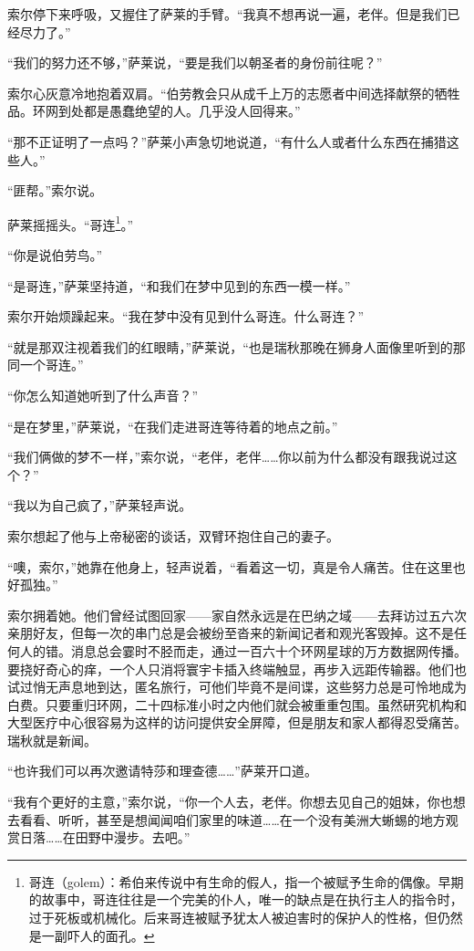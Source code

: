 \documentclass[AutoFakeBold=true]{book}
\begin{document}
索尔停下来呼吸，又握住了萨莱的手臂。``我真不想再说一遍，老伴。但是我们已经尽力了。''

``我们的努力还不够，''萨莱说，``要是我们以朝圣者的身份前往呢？''

索尔心灰意冷地抱着双肩。``伯劳教会只从成千上万的志愿者中间选择献祭的牺牲品。环网到处都是愚蠢绝望的人。几乎没人回得来。''

``那不正证明了一点吗？''萨莱小声急切地说道，``有什么人或者什么东西在捕猎这些人。''

``匪帮。''索尔说。

萨莱摇摇头。``哥连\footnote{哥连（golem）：希伯来传说中有生命的假人，指一个被赋予生命的偶像。早期的故事中，哥连往往是一个完美的仆人，唯一的缺点是在执行主人的指令时，过于死板或机械化。后来哥连被赋予犹太人被迫害时的保护人的性格，但仍然是一副吓人的面孔。}。''

``你是说伯劳鸟。''

``是哥连，''萨莱坚持道，``和我们在梦中见到的东西一模一样。''

索尔开始烦躁起来。``我在梦中没有见到什么哥连。什么哥连？''

``就是那双注视着我们的红眼睛，''萨莱说，``也是瑞秋那晚在狮身人面像里听到的那同一个哥连。''

``你怎么知道她听到了什么声音？''

``是在梦里，''萨莱说，``在我们走进哥连等待着的地点之前。''

``我们俩做的梦不一样，''索尔说，``老伴，老伴……你以前为什么都没有跟我说过这个？''

``我以为自己疯了，''萨莱轻声说。

索尔想起了他与上帝秘密的谈话，双臂环抱住自己的妻子。

``噢，索尔，''她靠在他身上，轻声说着，``看着这一切，真是令人痛苦。住在这里也好孤独。''

索尔拥着她。他们曾经试图回家——家自然永远是在巴纳之域——去拜访过五六次亲朋好友，但每一次的串门总是会被纷至沓来的新闻记者和观光客毁掉。这不是任何人的错。消息总会霎时不胫而走，通过一百六十个环网星球的万方数据网传播。要挠好奇心的痒，一个人只消将寰宇卡插入终端触显，再步入远距传输器。他们也试过悄无声息地到达，匿名旅行，可他们毕竟不是间谍，这些努力总是可怜地成为白费。只要重归环网，二十四标准小时之内他们就会被重重包围。虽然研究机构和大型医疗中心很容易为这样的访问提供安全屏障，但是朋友和家人都得忍受痛苦。瑞秋就是新闻。

``也许我们可以再次邀请特莎和理查德……''萨莱开口道。

``我有个更好的主意，''索尔说，``你一个人去，老伴。你想去见自己的姐妹，你也想去看看、听听，甚至是想闻闻咱们家里的味道……在一个没有美洲大蜥蜴的地方观赏日落……在田野中漫步。去吧。''
\end{document}
